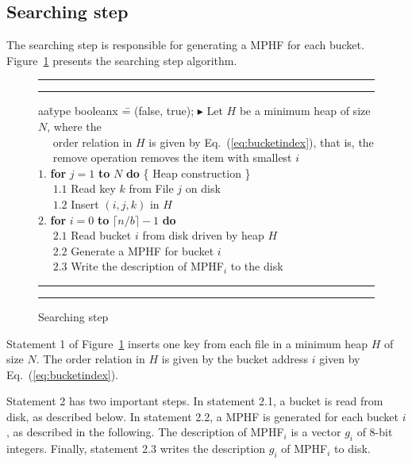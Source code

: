\vspace{-7mm}
\subsection{Searching step}
\label{sec:searching}

\enlargethispage{2\baselineskip}
The searching step is responsible for generating a MPHF for each 
bucket.
Figure~\ref{fig:searchingstep} presents the searching step algorithm.
\vspace{-2mm}
\begin{figure}[h]
\hrule 
\hrule 
\vspace{2mm}
\begin{tabbing}
aa\=type booleanx \==  (false, true); \kill
\> $\blacktriangleright$ Let $H$ be a minimum heap of size $N$, where the \\
\> ~~ order relation in $H$ is given by Eq.~(\ref{eq:bucketindex}), that is, the\\
\> ~~ remove operation removes the item with smallest $i$\\ 
\> $1.$ {\bf for} $j = 1$ {\bf to} $N$ {\bf do} \{ Heap construction \}\\
\> ~~ $1.1$ Read key $k$ from File $j$ on disk\\
\> ~~ $1.2$ Insert $(i, j, k)$ in $H$ \\
\> $2.$ {\bf for} $i = 0$ {\bf to} $\lceil n/b \rceil - 1$ {\bf do} \\
\> ~~ $2.1$ Read bucket $i$ from disk driven by heap $H$ \\
\> ~~ $2.2$ Generate a MPHF for bucket $i$ \\
\> ~~ $2.3$ Write the description of MPHF$_i$ to the disk 
\end{tabbing}
\vspace{-1mm}
\hrule 
\hrule 
\caption{Searching step}
\label{fig:searchingstep}
\vspace{-4mm}
\end{figure}

Statement 1 of Figure~\ref{fig:searchingstep} inserts one key from each file
in a minimum heap $H$ of size $N$.
The order relation in $H$ is given by the bucket address $i$ given by
Eq.~(\ref{eq:bucketindex}).

Statement 2 has two important steps.
In statement 2.1, a bucket is read from disk,
as described below.
In statement 2.2, a MPHF is generated for each bucket $i$, as described 
in the following.
The description of MPHF$_i$ is a vector $g_i$ of 8-bit integers.
Finally, statement 2.3 writes the description $g_i$ of MPHF$_i$ to disk.

